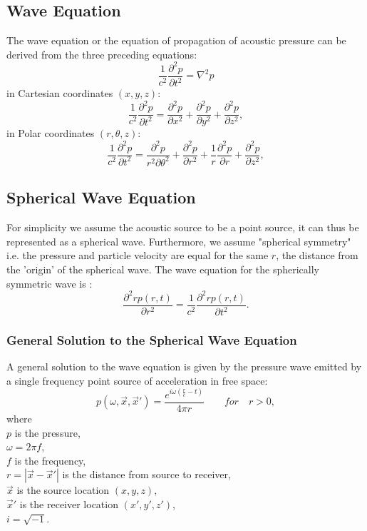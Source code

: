 \subsection{Wave Equation}
The wave equation or the equation of propagation of acoustic pressure can be derived from the three preceding equations:
\begin{equation}
    \frac{1}{c^2}\frac{\partial^2p}{\partial t^2} = \nabla^2p
\end{equation}
in Cartesian coordinates $(x,y,z)$:
\begin{equation}
    \frac{1}{c^2}\frac{\partial^2p}{\partial t^2} = \frac{\partial^2p}{\partial x^2} + \frac{\partial^2p}{\partial y^2} + \frac{\partial^2p}{\partial z^2},
\end{equation}
in Polar coordinates $(r,\theta, z)$:
\begin{equation}
    \frac{1}{c^2}\frac{\partial^2p}{\partial t^2} = \frac{\partial^2p}{r^2\partial \theta^2} + \frac{\partial^2p}{\partial r^2} + \frac{1}{r}\frac{\partial^2p}{\partial r} + \frac{\partial^2p}{\partial z^2},
\end{equation}

\subsection{Spherical Wave Equation}

For simplicity we assume the acoustic source to be a point source, it can thus be represented as a spherical wave. Furthermore, we assume "spherical symmetry" i.e. the pressure and particle velocity are equal for the same $r$, the distance from the 'origin' of the spherical wave. The wave equation for the spherically symmetric wave is \cite{Waves2004}:
\begin{equation}
    \frac{\partial^2rp(r,t)}{\partial r^2} = \frac{1}{c^2}\frac{\partial^2rp(r,t)}{\partial t^2}.
\end{equation}
\subsubsection{General Solution to the Spherical Wave Equation}
A general solution to the wave equation is given by the pressure wave emitted by a single frequency point source of acceleration in free space\cite{Allen1979}:
\begin{equation}
    p(\omega,\Vec{x},\Vec{x}') = \frac{e^{i\omega(\frac{r}{c}-t)}}{4\pi r}\quad\quad for\quad r > 0,
    \label{eq:point_source}
\end{equation}
where\\
$p$ is the pressure,\\
$\omega=2\pi f$,\\
$f$ is the frequency,\\
$r=|\Vec{x}-\Vec{x}'|$ is the distance from source to receiver,\\
$\Vec{x}$ is the source location $(x,y,z)$,\\
$\Vec{x}'$ is the receiver location $(x',y',z')$,\\
$i=\sqrt{-1}$.
\newpage

